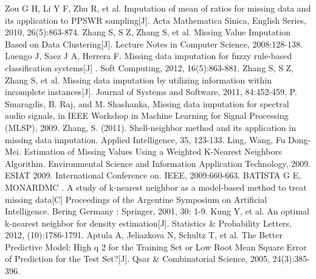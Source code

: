 \documentclass[print]{jicspack}
\begin{document}
\begin{thebibliography}{00}
 Zou G H, Li Y F, Zhu R, et al. Imputation of mean of ratios for missing data and its application to PPSWR sampling[J]. Acta Mathematica Sinica, English Series, 2010, 26(5):863-874.
 Zhang S, S Z, Zhang S, et al. Missing Value Imputation Based on Data Clustering[J]. Lecture Notes in Computer Science, 2008:128-138.
 Luengo J, Saez J A, Herrera F. Missing data imputation for fuzzy rule-based classification systems[J] . Soft Computing, 2012, 16(5):863-881.
 Zhang S, S Z, Zhang S, et al. Missing data imputation by utilizing information within incomplete instances[J]. Journal of Systems and Software, 2011, 84:452-459.
 P. Smaragdis, B. Raj, and M. Shashanka, Missing data imputation for spectral audio signals, in IEEE Workshop in Machine Learning for Signal Processing (MLSP), 2009.
 Zhang, S. (2011). Shell-neighbor method and its application in missing data imputation. Applied Intelligence, 35, 123-133.
 Ling, Wang, Fu Dong-Mei. Estimation of Missing Values Using a Weighted K-Nearest Neighbors Algorithm. Environmental Science and Information Application Technology, 2009. ESIAT 2009. International Conference on. IEEE, 2009:660-663.
 BATISTA G E, MONARDMC . A study of k-nearest neighbor as a model-based method to treat missing data[C] Proceedings of the Argentine Symposium on Artificial Intelligence. Bering Germany : Springer, 2001, 30: 1-9.
 Kung Y, et al. An optimal k-nearest neighbor for density estimation[J]. Statistics \& Probability Letters, 2012, (10):1786-1791.
 Aptula A, Jeliazkova N, Schultz T, et al. The Better Predictive Model: High q 2 for the Training Set or Low Root Mean Square Error of Prediction for the Test Set?[J]. Qsar \& Combinatorial Science, 2005, 24(3):385-396.
\end{thebibliography}
\end{document}
